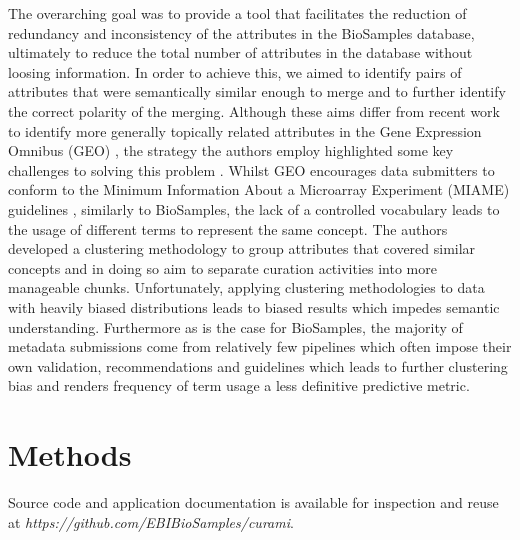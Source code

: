 \documentclass{bmcart}
\begin{document}
The overarching goal was to provide a tool that facilitates the reduction of redundancy and inconsistency of the attributes in the BioSamples database, ultimately to reduce the total number of attributes in the database without loosing information. In order to achieve this, we aimed to identify pairs of attributes that were semantically similar enough to merge and to further identify the correct polarity of the merging. Although these aims differ from recent work to identify more generally topically related attributes in the Gene Expression Omnibus (GEO) \cite{edgar2002gene, barrett2012ncbi}, the strategy the authors employ highlighted some key challenges to solving this problem \cite{hu2017cleaning}. Whilst GEO encourages data submitters to conform to the Minimum Information About a Microarray Experiment (MIAME) guidelines \cite{brazma2001minimum}, similarly to BioSamples, the lack of a controlled vocabulary leads to the usage of different terms to represent the same concept. The authors developed a clustering methodology to group attributes that covered similar concepts and in doing so aim to separate curation activities into more manageable chunks. Unfortunately, applying clustering methodologies to data with heavily biased distributions leads to biased results which impedes semantic understanding. Furthermore as is the case for BioSamples, the majority of metadata submissions come from relatively few pipelines which often impose their own validation, recommendations and guidelines which leads to further clustering bias and renders frequency of term usage a less definitive predictive metric.


\section*{Methods}

Source code and application documentation is available for inspection and reuse at \textit{https://github.com/EBIBioSamples/curami}.
\end{document}
